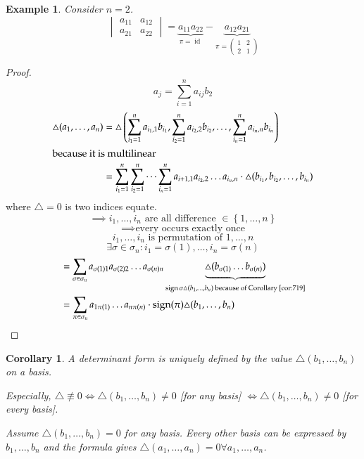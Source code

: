 \documentclass{article}
\newtheorem{example}{Example}  \numberwithin{example}{section}
\newtheorem*{corollary}{Corollary}%
\newcommand{\set}[1]{\left\{#1\right\}}
\DeclareMathOperator{\sign}{sign}
\begin{document}
\begin{example}
  Consider $n=2$.
  \[
    \begin{vmatrix}
      a_{11} & a_{12} \\
      a_{21} & a_{22}
    \end{vmatrix} = \underbrace{a_{11} a_{22}}_{\pi = \operatorname{id}} - \underbrace{a_{12} a_{21}}_{\pi = \begin{pmatrix} 1 & 2 \\ 2 & 1 \end{pmatrix}}
  \]
\end{example}

\begin{proof}
  \[ a_j = \sum_{i=1}^n a_{ij} b_2 \]
  \begin{align*}
    \triangle(a_1, \dots, a_n) &= \triangle\left(\sum_{i_1 = 1}^n a_{i_1,1} b_{i_1}, \sum_{i_2 = 1}^n a_{i_2,2} b_{i_2}, \dots, \sum_{i_n = 1}^n a_{i_n, n} b_{i_n}\right) \\
    \intertext{because it is multilinear}
      &= \sum_{i_1 = 1}^n \sum_{i_2=1}^n \dots \sum_{i_n=1}^n a_{i+1,1} a_{i_2,2} \dots a_{i_n,n} \cdot \triangle(b_{i_1}, b_{i_2}, \dots, b_{i_n})
  \end{align*}
  where $\triangle = 0$ is two indices equate.
  \[ \implies i_1,\dots,i_n \text{ are all difference } \in \set{1,\dots,n} \]
  \[ \implies \text{every occurs exactly once} \]
  \[ i_1,\dots,i_n \text{ is permutation of } 1,\dots,n \]
  \[ \exists \sigma \in \sigma_n: i_1 = \sigma(1), \dots, i_n = \sigma(n) \]
  \begin{align*}
    &= \sum_{\sigma \in \sigma_n} a_{\sigma(1) 1} a_{\sigma(2) 2} \dots a_{\sigma(n) n} \underbrace{\triangle(b_{\sigma(1)} \dots b_{\sigma(n)})}_{\sign\sigma \triangle(b_1, \dots, b_n) \text{ because of Corollary~\ref{cor:719}}} \\
    &= \sum_{\pi \in \sigma_n} a_{1 \pi(1)} \dots a_{n \pi(n)} \cdot \sign(\pi) \triangle(b_1, \dots, b_n)
  \end{align*}
\end{proof}

\begin{corollary}
  A determinant form is uniquely defined by the value $\triangle(b_1, \dots, b_n)$ on a basis.

  Especially, $\triangle \not\equiv 0 \iff \triangle(b_1,\dots,b_n) \neq 0$ [for any basis] $\iff \triangle(b_1,\dots,b_n) \neq 0$ [for every basis].

  Assume $\triangle(b_1,\dots,b_n) = 0$ for any basis.
  Every other basis can be expressed by $b_1,\dots,b_n$ and the formula gives $\triangle(a_1,\dots,a_n) = 0 \forall a_1,\dots,a_n$.
\end{corollary}
\end{document}

